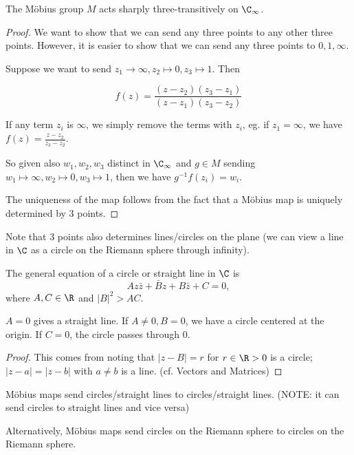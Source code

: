\documentclass[a4paper]{article}
\begin{document}
  \begin{prop}
    The M\"obius group $M$ acts sharply three-transitively on $\C_\infty$.
  \end{prop}

  \begin{proof}
    We want to show that we can send any three points to any other three points. However, it is easier to show that we can send any three points to $0, 1, \infty$. 

    Suppose we want to send $z_1\to \infty, z_2\mapsto 0, z_3 \mapsto 1$. Then

    \[
      f(z) = \frac{(z - z_2)(z_3 - z_1)}{(z - z_1)(z_3 - z_2)}
    \]

    If any term $z_i$ is $\infty$, we simply remove the terms with $z_i$, eg. if $z_1 = \infty$, we have $f(z) = \frac{z - z_2}{z_3 - z_2}$.

    So given also $w_1, w_2, w_3$ distinct in $\C_\infty$ and $g\in M$ sending $w_1\mapsto \infty, w_2\mapsto 0, w_3\mapsto 1$, then we have $g^{-1}f(z_i) = w_i$.

    The uniqueness of the map follows from the fact that a M\"obius map is uniquely determined by 3 points.
  \end{proof}

  Note that 3 points also determines lines/circles on the plane (we can view a line in $\C$ as a circle on the Riemann sphere through infinity).

  \begin{lemma}
    The general equation of a circle or straight line in $\C$ is
    \[
      Az\bar z + \bar Bz + B\bar z + C = 0,
    \]
    where $A, C\in \R$ and $|B|^2 > AC$.
  \end{lemma}
  \note $A = 0$ gives a straight line. If $A \not= 0, B = 0$, we have a circle centered at the origin. If $C = 0$, the circle passes through 0.

  \begin{proof}
    This comes from noting that $|z - B| = r$ for $r \in \R> 0$ is a circle; $|z - a| = |z - b|$ with $a\not= b $ is a line. (cf. Vectors and Matrices)
  \end{proof}

  \begin{prop}
    M\"obius maps send circles/straight lines to circles/straight lines. (NOTE: it can send circles to straight lines and vice versa)

    Alternatively, M\"obius maps send circles on the Riemann sphere to circles on the Riemann sphere.
  \end{prop}
\end{document}
